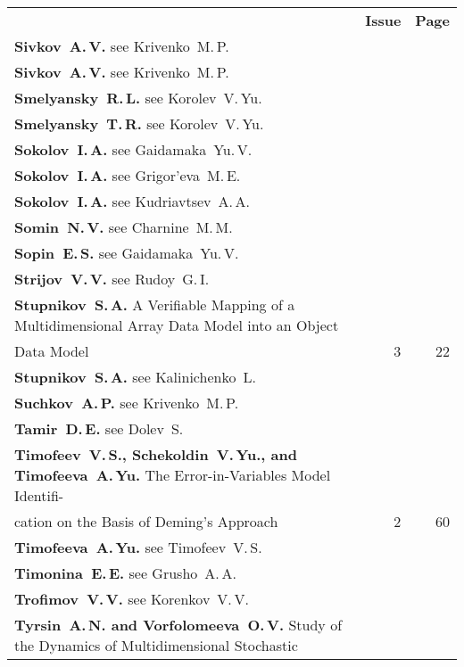 {\tabcolsep=3pt
\begin{tabular}{p{397pt}rr}
&\textbf{Issue} & \textbf{Page}\\[6pt]
\textbf{Sivkov~A.\,V.} see Krivenko~M.\,P.&&\\
\textbf{Sivkov~A.\,V.} see Krivenko~M.\,P.&&\\
\textbf{Smelyansky~R.\,L.} see Korolev~V.\,Yu.&&\\
\textbf{Smelyansky~T.\,R.} see Korolev~V.\,Yu.&&\\
\textbf{Sokolov~I.\,A.} see Gaidamaka~Yu.\,V.&&\\
\textbf{Sokolov~I.\,A.} see Grigor'eva~M.\,E.&&\\
\textbf{Sokolov~I.\,A.} see Kudriavtsev~A.\,A.&&\\
\textbf{Somin~N.\,V.} see Charnine~M.\,M.&&\\
\textbf{Sopin~E.\,S.} see Gaidamaka~Yu.\,V.&&\\
\textbf{Strijov~V.\,V.} see Rudoy~G.\,I.&&\\
\textbf{Stupnikov~S.\,A.}
A Verifiable Mapping of a Multidimensional Array Data Model into an Object\linebreak
\vspace*{-12pt}\\
\hspace*{23pt}Data Model\dotfill&3&22\\
\textbf{Stupnikov~S.\,A.} see Kalinichenko~L.&&\\
\textbf{Suchkov~A.\,P.} see Krivenko~M.\,P.&&\\
\textbf{Tamir~D.\,E.} see Dolev~S.&&\\
\textbf{Timofeev~V.\,S., Schekoldin~V.\,Yu., and Timofeeva~A.\,Yu.}
The Error-in-Variables Model Identifi-\linebreak
\vspace*{-12pt}\\
\hspace*{23pt}cation on the Basis of Deming's Approach\dotfill&2&60\\
\textbf{Timofeeva~A.\,Yu.} see Timofeev~V.\,S.&&\\
\textbf{Timonina~E.\,E.} see Grusho~A.\,A.&&\\
\textbf{Trofimov~V.\,V.} see Korenkov~V.\,V.&&\\
\textbf{Tyrsin~A.\,N. and Vorfolomeeva~O.\,V.}
Study of the Dynamics of Multidimensional Stochastic\linebreak
\vspace*{-12pt}\\

\end{tabular}}
